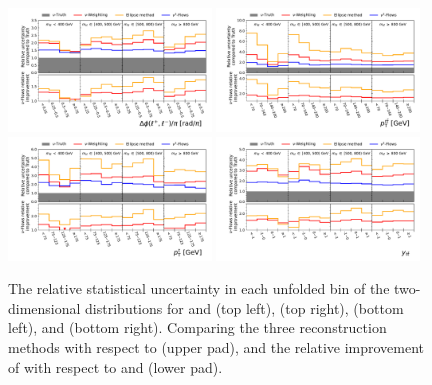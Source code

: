 \begin{figure}[htpb]
    \centering
    \includegraphics[width=0.48\textwidth]{Figures/neutrino_unfolding/unfolding/unfold_error_lep_del_phi_7.pdf}
    \includegraphics[width=0.48\textwidth]{Figures/neutrino_unfolding/unfolding/unfold_error_ttbar_pt_7.pdf} \\
    \includegraphics[width=0.48\textwidth]{Figures/neutrino_unfolding/unfolding/unfold_error_top_pt_7.pdf}
    \includegraphics[width=0.48\textwidth]{Figures/neutrino_unfolding/unfolding/unfold_error_ttbar_rapidity_7.pdf}
    \caption{The relative statistical uncertainty in each unfolded bin of the two-dimensional distributions for \mttbar and \dphill (top left), \pttop (top right), \pttt (bottom left), and \ytt (bottom right).
        Comparing the three reconstruction methods with respect to \vtruth (upper pad), and the relative improvement of \vflows with respect to \vweight and \ellipse (lower pad).}
    \label{fig:stat_gain_unfold_all}
\end{figure}

